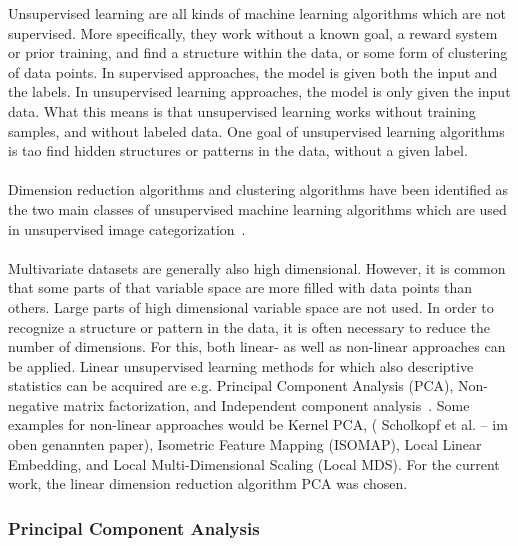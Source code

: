 Unsupervised learning are all kinds of machine learning algorithms which are not supervised. More specifically, they work without a known goal, a reward system or prior training, and find a structure within the data, or some form of clustering of data points. In supervised approaches, the model is given both the input and the labels. In unsupervised learning approaches, the model is only given the input data. What this means is that unsupervised learning works without training samples, and without labeled data. One goal of unsupervised learning algorithms is tao find hidden structures or patterns in the data, without a given label. \\
\\
Dimension reduction algorithms and clustering algorithms have been identified as the two main classes of unsupervised machine learning algorithms which are used in unsupervised image categorization~\citep{article}. \\
\\
Multivariate datasets are generally also high dimensional. However, it is common that some parts of that variable space are more filled with data points than others. Large parts of high dimensional variable space are not used. In order to recognize a structure or pattern in the data, it is often necessary to reduce the number of dimensions. For this, both linear- as well as non-linear approaches can be applied. Linear unsupervised learning methods for which also descriptive statistics can be acquired are e.g. Principal Component Analysis (PCA), Non-negative matrix factorization, and Independent component analysis~\citep{article}. Some examples for non-linear approaches would be Kernel PCA,  ( Scholkopf  et  al. – im oben genannten paper),  Isometric  Feature  Mapping  (ISOMAP),  Local  Linear  Embedding,  and Local  Multi-Dimensional  Scaling  (Local  MDS). 
For the current work, the linear dimension reduction algorithm PCA was chosen.

\subsubsection{Principal Component Analysis}


